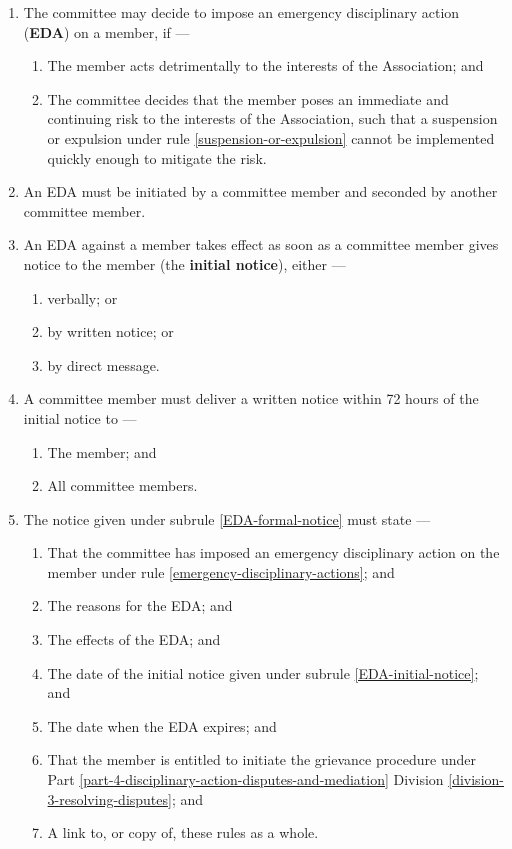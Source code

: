 \documentclass[../constitution.tex]{subfiles}
\begin{document}
\begin{enumerate}

\item The committee may decide to impose an emergency disciplinary action (\textbf{EDA}) on a member, if ---

  \begin{enumerate}
  \item The member acts detrimentally to the interests of the Association; and
  \item The committee decides that the member poses an immediate and continuing risk to the interests of the Association, such that a suspension or expulsion under rule \ref{suspension-or-expulsion} cannot be implemented quickly enough to mitigate the risk.
  \end{enumerate}

\item An EDA must be initiated by a committee member and seconded by another committee member.

\item \label{EDA-initial-notice} An EDA against a member takes effect as soon as a committee member gives notice to the member (the \textbf{initial notice}), either ---

  \begin{enumerate}
  \item verbally; or
  \item by written notice; or
  \item by direct message.
  \end{enumerate}

\item \label{EDA-formal-notice} A committee member must deliver a written notice within 72 hours of the initial notice to ---

  \begin{enumerate}
  \item The member; and
  \item All committee members.
  \end{enumerate}

\item The notice given under subrule \ref{EDA-formal-notice} must state ---

  \begin{enumerate}
  \item That the committee has imposed an emergency disciplinary action on the member under rule \ref{emergency-disciplinary-actions}; and
  \item The reasons for the EDA; and
  \item The effects of the EDA; and
  \item The date of the initial notice given under subrule \ref{EDA-initial-notice}; and
  \item The date when the EDA expires; and
  \item That the member is entitled to initiate the grievance procedure under Part \ref{part-4-disciplinary-action-disputes-and-mediation} Division \ref{division-3-resolving-disputes}; and
  \item A link to, or copy of, these rules as a whole.
  \end{enumerate}


\end{enumerate}
\end{document}
